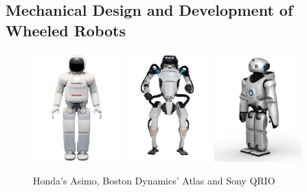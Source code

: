 \subsection{Mechanical Design and Development of Wheeled Robots}
\begin {figure}[h]
\centering
\includegraphics[width=0.3\textwidth]{Honda's Asimo}
\includegraphics[width=0.3\textwidth]{Boston Dynamics' Atlas}
\includegraphics[width=0.3\textwidth]{sony QRIO}
\caption{Honda's Asimo, Boston Dynamics' Atlas and Sony QRIO\cite{asimo}\cite{atlas}\cite{qrio}}
\label{fig:Asimo, Atlas and QRIO}
\end {figure}


